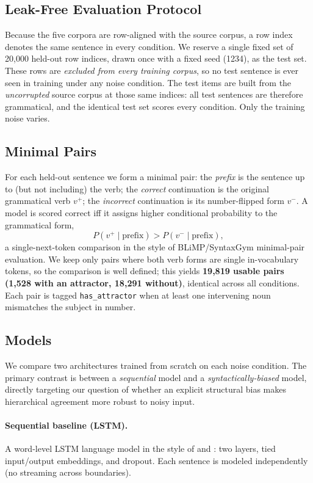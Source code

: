 \subsection{Leak-Free Evaluation Protocol}
\label{sec:leakfree}
Because the five corpora are row-aligned with the source corpus, a row index
denotes the same sentence in every condition. We reserve a single fixed set of
20{,}000 held-out row indices, drawn once with a fixed seed (1234), as the test
set. These rows are \emph{excluded from every training corpus}, so no test
sentence is ever seen in training under any noise condition. The test items are
built from the \emph{uncorrupted} source corpus at those same indices: all test
sentences are therefore grammatical, and the identical test set scores every
condition. Only the training noise varies.

\subsection{Minimal Pairs}
\label{sec:minimalpairs}
For each held-out sentence we form a minimal pair: the \emph{prefix} is the
sentence up to (but not including) the verb; the \emph{correct} continuation is
the original grammatical verb $v^{+}$; the \emph{incorrect} continuation is its
number-flipped form $v^{-}$. A model is scored correct iff it assigns higher
conditional probability to the grammatical form,
\[
  P(v^{+}\mid \text{prefix}) > P(v^{-}\mid \text{prefix}),
\]
a single-next-token comparison in the style of BLiMP/SyntaxGym minimal-pair
evaluation. We keep only pairs where both verb forms are single in-vocabulary
tokens, so the comparison is well defined; this yields \textbf{19{,}819 usable
pairs (1{,}528 with an attractor, 18{,}291 without)}, identical across all
conditions. Each pair is tagged \texttt{has\_attractor} when at least one
intervening noun mismatches the subject in number.

\subsection{Models}
\label{sec:models}
We compare two architectures trained from scratch on each noise condition. The
primary contrast is between a \emph{sequential} model and a
\emph{syntactically-biased} model, directly targeting our question of whether an
explicit structural bias makes hierarchical agreement more robust to noisy
input.

\paragraph{Sequential baseline (LSTM).} A word-level LSTM language model in the
style of \citet{linzen2016} and \citet{gulordava2018}: two layers, tied
input/output embeddings, and dropout. Each sentence is modeled independently (no
streaming across boundaries).

